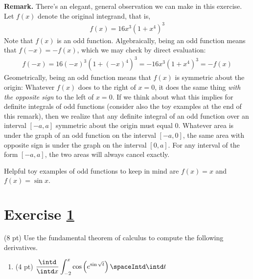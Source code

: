 {\textbf{Remark.} There's an elegant, general observation we can make in this exercise. Let $f(x)$ denote the original integrand, that is,
\begin{align*}
f(x)
=
16 x^{3} (1 + x^{4})^{3}
\end{align*}
Note that $f(x)$ is an odd function. Algebraically, being an odd function means that $f(-x) = -f(x)$, which we may check by direct evaluation:
\begin{align*}
f(-x)
=
16 (-x)^{3} (1 + (-x)^{4})^{3}
=
-16 x^{3} (1 + x^{4})^{3}
=
-f(x)
\end{align*}
Geometrically, being an odd function means that $f(x)$ is symmetric about the origin: Whatever $f(x)$ does to the right of $x = 0$, it does the same thing \emph{with the opposite sign} to the left of $x = 0$. If we think about what this implies for definite integrals of odd functions (consider also the toy examples at the end of this remark), then we realize that any definite integral of an odd function over an interval $[-a,a]$ symmetric about the origin must equal $0$. Whatever area is under the graph of an odd function on the interval $[-a,0]$, the same area with opposite sign is under the graph on the interval $[0,a]$. For any interval of the form $[-a,a]$, the two areas will always cancel exactly.

Helpful toy examples of odd functions to keep in mind are $f(x) = x$ and $f(x) = \sin x$.}%





%
%
%
%


\newpage

\section{Exercise \ref{sec : Math112 Spring2022 MockExam3 Q4}}
\label{sec : Math112 Spring2022 MockExam3 Q4}

(8 pt) Use the fundamental theorem of calculus to compute the following derivatives.



\begin{enumerate}[label=(\alph*)]
\item\label{itm : ME3Q4a} (4 pt) $\displaystyle\frac{\intd}{\intd x} \int_{-2}^{x} \cos\left(e^{\sin \sqrt{t}}\right) \spaceIntd \intd t$
\end{enumerate}

